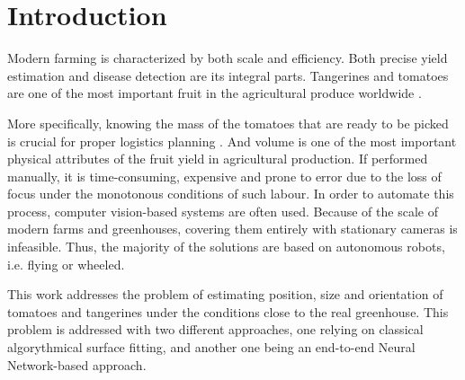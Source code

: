 \chapter*{Introduction}                         %

\newcommand{\actuality}{}
\newcommand{\progress}{}
\newcommand{\aim}{{\textbf\aimTXT}}
\newcommand{\tasks}{\textbf{\tasksTXT}}
\newcommand{\novelty}{\textbf{\noveltyTXT}}
\newcommand{\influence}{\textbf{\influenceTXT}}
\newcommand{\methods}{\textbf{\methodsTXT}}
\newcommand{\defpositions}{\textbf{\defpositionsTXT}}
\newcommand{\reliability}{\textbf{\reliabilityTXT}}
\newcommand{\probation}{\textbf{\probationTXT}}
\newcommand{\contribution}{\textbf{\contributionTXT}}
\newcommand{\publications}{\textbf{\publicationsTXT}}

%
%



Modern farming is characterized by both scale and efficiency.
Both precise yield estimation and disease detection are its integral parts.
Tangerines and tomatoes are one of the most important fruit in the agricultural produce worldwide \cite{li2025metafruit}.

More specifically, knowing the mass of the tomatoes that are ready to be picked is crucial for proper logistics planning \cite{tahir2021comprehensive}.
And volume is one of the most important physical attributes of the fruit yield in agricultural production.
If performed manually, it is time-consuming, expensive and prone to error due to the loss of focus under the monotonous conditions of such labour.
In order to automate this process, computer vision-based systems are often used.
Because of the scale of modern farms and greenhouses, covering them entirely with stationary cameras is infeasible.
Thus, the majority of the solutions are based on autonomous robots, i.e. flying or wheeled.

This work addresses the problem of estimating position, size and orientation of tomatoes and tangerines under the conditions close to the real greenhouse.
This problem is addressed with two different approaches, one relying on classical algorythmical surface fitting, and another one being an end-to-end Neural Network-based approach.

